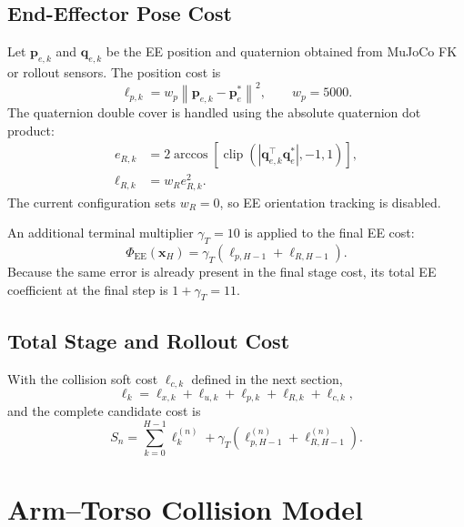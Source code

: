 \documentclass[11pt,a4paper]{article}
\newcommand{\sqnorm}[1]{\left\lVert #1 \right\rVert^2}
\newcommand{\clip}{\operatorname{clip}}
\begin{document}
\subsection{End-Effector Pose Cost}

Let $\bm{p}_{e,k}$ and $\bm{q}_{e,k}$ be the EE position and quaternion
obtained from MuJoCo FK or rollout sensors. The position cost is
\begin{equation}
  \ell_{p,k}=
  w_p\sqnorm{\bm{p}_{e,k}-\bm{p}_e^*},
  \qquad w_p=5000.
\end{equation}
The quaternion double cover is handled using the absolute quaternion dot
product:
\begin{align}
  e_{R,k}
  &=2\arccos\left[
    \clip\left(
      \left|\bm{q}_{e,k}^\top\bm{q}_e^*\right|,-1,1
    \right)
  \right],\\
  \ell_{R,k}
  &=w_R e_{R,k}^2.
\end{align}
The current configuration sets $w_R=0$, so EE orientation tracking is
disabled.

An additional terminal multiplier $\gamma_T=10$ is applied to the final EE
cost:
\begin{equation}
  \Phi_{\mathrm{EE}}(\bm{x}_H)
  =\gamma_T(\ell_{p,H-1}+\ell_{R,H-1}).
\end{equation}
Because the same error is already present in the final stage cost, its total
EE coefficient at the final step is $1+\gamma_T=11$.

\subsection{Total Stage and Rollout Cost}

With the collision soft cost $\ell_{c,k}$ defined in the next section,
\begin{equation}
  \ell_k=
  \ell_{x,k}+\ell_{u,k}+\ell_{p,k}+\ell_{R,k}+\ell_{c,k},
\end{equation}
and the complete candidate cost is
\begin{equation}
  \boxed{
  S_n=
  \sum_{k=0}^{H-1}\ell_k^{(n)}
  +\gamma_T\left(
    \ell_{p,H-1}^{(n)}+\ell_{R,H-1}^{(n)}
  \right).
  }
\end{equation}

\section{Arm--Torso Collision Model}
\end{document}
